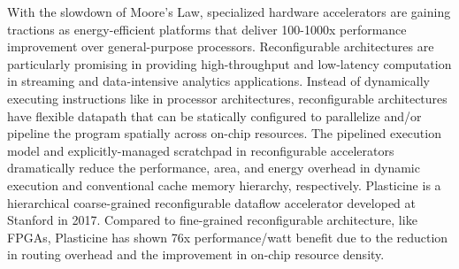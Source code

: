 


With the slowdown of Moore’s Law, specialized hardware accelerators are gaining tractions as energy-efficient platforms that deliver 100-1000x performance improvement over general-purpose processors. 
Reconfigurable architectures are particularly promising in providing high-throughput and low-latency
computation in streaming and data-intensive analytics applications. Instead of dynamically executing
instructions like in processor architectures, reconfigurable architectures have flexible datapath
that can be statically configured to parallelize and/or pipeline the program spatially across
on-chip resources. The pipelined execution model and explicitly-managed scratchpad in reconfigurable
accelerators dramatically reduce the performance, area, and energy overhead in dynamic execution and
conventional cache memory hierarchy, respectively. Plasticine is a hierarchical coarse-grained
reconfigurable dataflow accelerator developed at Stanford in 2017. Compared to fine-grained reconfigurable architecture, like FPGAs, Plasticine has shown 76x performance/watt benefit due to the reduction in routing overhead and the improvement in on-chip resource density. 


